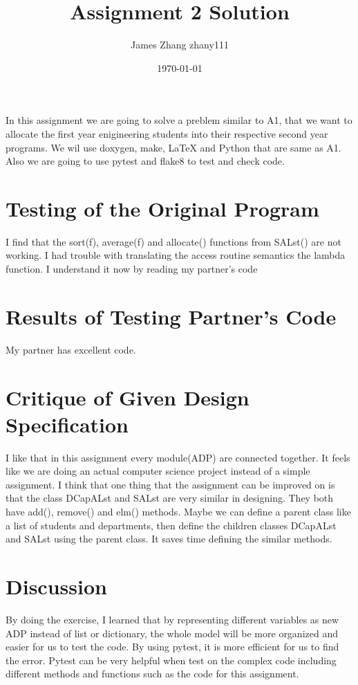 \documentclass[12pt]{article}
\title{Assignment 2 Solution}
\author{James Zhang zhany111}
\date{\today}
\begin{document}
\maketitle

In this assignment we are going to solve a preblem similar to A1, that we want to allocate the first year enigineering students into their respective second year programs. We wil use doxygen, make, LaTeX and Python that are same as A1. Also we are going to use pytest and flake8 to test and check code. 

\section{Testing of the Original Program}

I find that the sort(f), average(f) and allocate() functions from SALst() are not working. I had trouble with translating the access routine semantics the lambda function. I understand it now by reading my partner’s code

\section{Results of Testing Partner's Code}

My partner has excellent code.

\section{Critique of Given Design Specification}

I like that in this assignment every module(ADP) are connected together. It feels like we are doing an actual computer science project instead of a simple assignment. I think that one thing that the assignment can be improved on is that the class DCapALst and SALst are very similar in designing. They both have add(), remove() and elm() methods. Maybe we can define a parent class like a list of students and departments, then define the children classes DCapALst and SALst using the parent class. It saves time defining the similar methods.

\section{Discussion }

By doing the exercise, I learned that by representing different variables as new ADP instead of list or dictionary, the whole model will be more organized and easier for us to test the code. By using pytest, it  is more efficient for us to find the error. Pytest can be very helpful when test on the complex code including different methods and functions such as the code for this assignment. 
\end{document}
